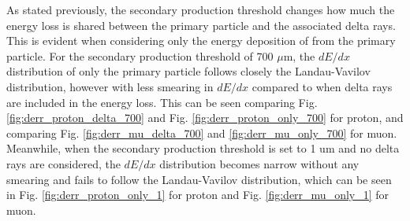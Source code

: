 As stated previously, the secondary production threshold changes how much the energy loss is shared between the primary particle and the associated delta rays.
This is evident when considering only the energy deposition of from the primary particle. 
For the secondary production threshold of 700 $\mu$m, the $dE/dx$ distribution of only the primary particle follows closely the Landau-Vavilov distribution, however with less smearing in $dE/dx$ compared to when delta rays are included in the energy loss.
This can be seen comparing Fig. \ref{fig:derr_proton_delta_700} and Fig. \ref{fig:derr_proton_only_700} for proton, and comparing Fig. \ref{fig:derr_mu_delta_700} and \ref{fig:derr_mu_only_700} for muon. 
Meanwhile, when the secondary production threshold is set to 1 um and no delta rays are considered, the $dE/dx$ distribution becomes narrow without any smearing and fails to follow the Landau-Vavilov distribution, which can be seen in Fig. \ref{fig:derr_proton_only_1} for proton and Fig. \ref{fig:derr_mu_only_1} for muon. 


